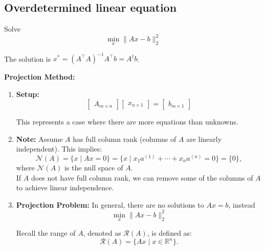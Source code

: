 \subsection{Overdetermined linear equation}
\begin{definition}
    Solve 
    \begin{equation*}
        \min_x \|Ax - b\|_2^2
    \end{equation*}

    The solution is  $x^* = (A^\top A)^{-1} A^\top b = A^\dagger b$.
\end{definition}
\begin{derivation} \textbf{Projection Method:}
    \begin{enumerate}
        \item \textbf{Setup:} \[
    \begin{bmatrix}
    A_{m \times n}
    \end{bmatrix}
    \begin{bmatrix}
    x_{n \times 1}
    \end{bmatrix}
    =
    \begin{bmatrix}
    b_{m \times 1}
    \end{bmatrix}
    \]


    This represents a case where there are more equations than unknowns. \\

    \item \textbf{Note:} Assume $A$ has full column rank (columns of $A$ are linearly independent). This implies:
    \[
    \mathcal{N}(A) = \{x \mid A x = 0 \} = \{x \mid x_1 a^{(1)} + \cdots + x_n a^{(n)} = 0 \} = \{0\},
    \]
    where $\mathcal{N}(A)$ is the null space of $A$. \\

    If $A$ does not have full column rank, we can remove some of the columns of $A$ to achieve linear independence. \\

    \item \textbf{Projection Problem:} In general, there are no solutions to $Ax=b$, instead
    \begin{equation*}
        \min_x \|Ax - b\|_2^2 
    \end{equation*}

    Recall the range of $A$, denoted as $\mathcal{R}(A)$, is defined as:
    \[
    \mathcal{R}(A) = \{Ax \mid x \in \mathbb{R}^n\}.
    \]


\end{enumerate}
\end{derivation}
